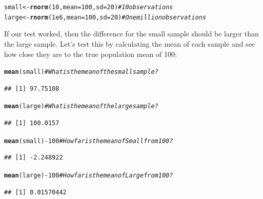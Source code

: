 \documentclass{tufte-book}\usepackage[]{graphicx}\usepackage[]{color}
\makeatletter
\newcommand{\hlnum}[1]{\textcolor[rgb]{0.686,0.059,0.569}{#1}}%
\newcommand{\hlcom}[1]{\textcolor[rgb]{0.678,0.584,0.686}{\textit{#1}}}%
\newcommand{\hlopt}[1]{\textcolor[rgb]{0,0,0}{#1}}%
\newcommand{\hlstd}[1]{\textcolor[rgb]{0.345,0.345,0.345}{#1}}%
\newcommand{\hlkwb}[1]{\textcolor[rgb]{0.69,0.353,0.396}{#1}}%
\newcommand{\hlkwc}[1]{\textcolor[rgb]{0.333,0.667,0.333}{#1}}%
\newcommand{\hlkwd}[1]{\textcolor[rgb]{0.737,0.353,0.396}{\textbf{#1}}}%
\newenvironment{kframe}{%
 \def\at@end@of@kframe{}%
 \ifinner\ifhmode%
  \def\at@end@of@kframe{\end{minipage}}%
  \begin{minipage}{\columnwidth}%
 \fi\fi%
 \def\FrameCommand##1{\hskip\@totalleftmargin \hskip-\fboxsep
 \colorbox{shadecolor}{##1}\hskip-\fboxsep
     \hskip-\linewidth \hskip-\@totalleftmargin \hskip\columnwidth}%
 \MakeFramed {\advance\hsize-\width
   \@totalleftmargin\z@ \linewidth\hsize
   \@setminipage}}%
 {\par\unskip\endMakeFramed%
 \at@end@of@kframe}
\newenvironment{knitrout}{}{} %
\makeatother
\begin{document}
\begin{footnotesize}
\begin{knitrout}
\color{fgcolor}\begin{kframe}
\begin{alltt}
\hlstd{small} \hlkwb{<-} \hlkwd{rnorm}\hlstd{(}\hlnum{10}\hlstd{,} \hlkwc{mean} \hlstd{=} \hlnum{100}\hlstd{,} \hlkwc{sd} \hlstd{=} \hlnum{20}\hlstd{)} \hlcom{# 10 observations}
\hlstd{large} \hlkwb{<-} \hlkwd{rnorm}\hlstd{(}\hlnum{1e6}\hlstd{,} \hlkwc{mean} \hlstd{=} \hlnum{100}\hlstd{,} \hlkwc{sd} \hlstd{=} \hlnum{20}\hlstd{)} \hlcom{# One million observations}
\end{alltt}
\end{kframe}
\end{knitrout}
\end{footnotesize}

If our test worked, then the difference for the small sample should be larger than the large sample. Let's test this by calculating the mean of each sample and see how close they are to the true population mean of 100:

\begin{footnotesize}
\begin{knitrout}
\color{fgcolor}\begin{kframe}
\begin{alltt}
\hlkwd{mean}\hlstd{(small)} \hlcom{# What is the mean of the small sample?}
\end{alltt}
\begin{verbatim}
## [1] 97.75108
\end{verbatim}
\begin{alltt}
\hlkwd{mean}\hlstd{(large)} \hlcom{# What is the mean of the large sample?}
\end{alltt}
\begin{verbatim}
## [1] 100.0157
\end{verbatim}
\begin{alltt}
\hlkwd{mean}\hlstd{(small)} \hlopt{-} \hlnum{100} \hlcom{# How far is the mean of Small from 100?}
\end{alltt}
\begin{verbatim}
## [1] -2.248922
\end{verbatim}
\begin{alltt}
\hlkwd{mean}\hlstd{(large)} \hlopt{-} \hlnum{100} \hlcom{# How far is the mean of Large from 100?}
\end{alltt}
\begin{verbatim}
## [1] 0.01570442
\end{verbatim}
\end{kframe}
\end{knitrout}
\end{footnotesize}
\end{document}

